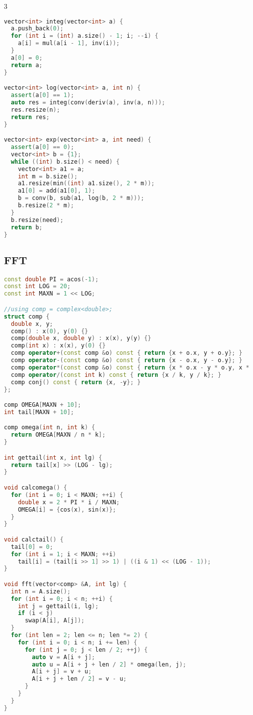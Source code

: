 \documentclass[9pt,a4paper,landscape,twosided]{extarticle}
\begin{document}
\begin{multicols*}{3}
\begin{lstlisting}[language=C++]
vector<int> integ(vector<int> a) {
  a.push_back(0);
  for (int i = (int) a.size() - 1; i; --i) {
    a[i] = mul(a[i - 1], inv(i));
  }
  a[0] = 0;
  return a;
}

vector<int> log(vector<int> a, int n) {
  assert(a[0] == 1);
  auto res = integ(conv(deriv(a), inv(a, n)));
  res.resize(n);
  return res;
}

vector<int> exp(vector<int> a, int need) {
  assert(a[0] == 0);
  vector<int> b = {1};
  while ((int) b.size() < need) {
    vector<int> a1 = a;
    int m = b.size();
    a1.resize(min((int) a1.size(), 2 * m));
    a1[0] = add(a1[0], 1);
    b = conv(b, sub(a1, log(b, 2 * m)));
    b.resize(2 * m);
  }
  b.resize(need);
  return b;
}
\end{lstlisting}

\subsection{FFT}
\begin{lstlisting}[language=C++]
const double PI = acos(-1);
const int LOG = 20;
const int MAXN = 1 << LOG;

//using comp = complex<double>;
struct comp {
  double x, y;
  comp() : x(0), y(0) {}
  comp(double x, double y) : x(x), y(y) {}
  comp(int x) : x(x), y(0) {}
  comp operator+(const comp &o) const { return {x + o.x, y + o.y}; }
  comp operator-(const comp &o) const { return {x - o.x, y - o.y}; }
  comp operator*(const comp &o) const { return {x * o.x - y * o.y, x * o.y + y * o.x}; }
  comp operator/(const int k) const { return {x / k, y / k}; }
  comp conj() const { return {x, -y}; }
};

comp OMEGA[MAXN + 10];
int tail[MAXN + 10];

comp omega(int n, int k) {
  return OMEGA[MAXN / n * k];
}

int gettail(int x, int lg) {
  return tail[x] >> (LOG - lg);
}

void calcomega() {
  for (int i = 0; i < MAXN; ++i) {
    double x = 2 * PI * i / MAXN;
    OMEGA[i] = {cos(x), sin(x)};
  }
}

void calctail() {
  tail[0] = 0;
  for (int i = 1; i < MAXN; ++i)
    tail[i] = (tail[i >> 1] >> 1) | ((i & 1) << (LOG - 1));
}

void fft(vector<comp> &A, int lg) {
  int n = A.size();
  for (int i = 0; i < n; ++i) {
    int j = gettail(i, lg);
    if (i < j)
      swap(A[i], A[j]);
  }
  for (int len = 2; len <= n; len *= 2) {
    for (int i = 0; i < n; i += len) {
      for (int j = 0; j < len / 2; ++j) {
        auto v = A[i + j];
        auto u = A[i + j + len / 2] * omega(len, j);
        A[i + j] = v + u;
        A[i + j + len / 2] = v - u;
      }
    }
  }
}


\end{lstlisting}
\end{multicols*}
\end{document}
